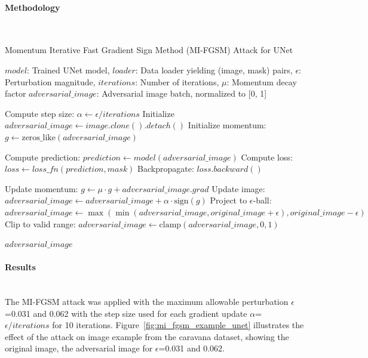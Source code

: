 \documentclass[../main.tex]{subfiles}
\begin{document}
\paragraph{Methodology}\leavevmode\\

\begin{breakablealgorithm}{Momentum Iterative Fast Gradient Sign Method (MI-FGSM) Attack for UNet}
\begin{algorithmic}[1]
\Require $model$: Trained UNet model, $loader$: Data loader yielding (image, mask) pairs, $\epsilon$: Perturbation magnitude, $iterations$: Number of iterations, $\mu$: Momentum decay factor
\Ensure $adversarial\_image$: Adversarial image batch, normalized to [0, 1]

\State Compute step size: $\alpha \gets \epsilon / iterations$
\State Initialize $adversarial\_image \gets image.clone().detach()$
\State Initialize momentum: $g \gets \text{zeros\_like}(adversarial\_image)$

    \State Compute prediction: $prediction \gets model(adversarial\_image)$
    \State Compute loss: $loss \gets loss\_fn(prediction, mask)$
    \State Backpropagate: $loss.backward()$
    
    \State Update momentum: $g \gets \mu \cdot g + adversarial\_image.grad$
    \State Update image: $adversarial\_image \gets adversarial\_image + \alpha \cdot \text{sign}(g)$
    \State Project to $\epsilon$-ball: $adversarial\_image \gets \max(\min(adversarial\_image, original\_image + \epsilon), original\_image - \epsilon)$
    \State Clip to valid range: $adversarial\_image \gets \text{clamp}(adversarial\_image, 0, 1)$
   
\EndFor

\State \Return $adversarial\_image$
\end{algorithmic}
\end{breakablealgorithm}
\paragraph{Results}\leavevmode\\

The MI-FGSM attack was applied with the maximum allowable perturbation  $\epsilon$=0.031 and 0.062 with the step size used for each gradient update $\alpha$=$\epsilon / iterations$ for 10 iterations. Figure~\ref{fig:mi_fgsm_example_unet} illustrates the effect of the attack on image example from the caravana dataset, showing the original image, the adversarial image for $\epsilon$=0.031 and 0.062.
\end{document}
